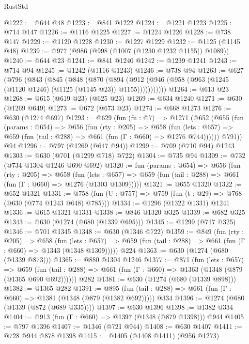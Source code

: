\begin{lexlean}{RustStd}
\begin{coremodule}
@1222 := @644 @48
@1223 := @841 @1222
@1224 := @1221 @1223
@1225 := @714 @147
@1226 := @1116 @1225
@1227 := @1224 @1226
@1228 := @738 @147
@1229 := @1120 @1228
@1230 := @1227 @1229
@1232 := @1125 (@1145 @48)
@1239 := @977 (@986 (@998 (@1007 (@1230 @1232 @1155)) @1089))
@1240 := @644 @23
@1241 := @841 @1240
@1242 := @1239 @1241
@1243 := @714 @94
@1245 := @1242 (@1116 @1243)
@1246 := @738 @94
@1263 := @627
    (@796
      (@843
        (@845
          (@848
            (@870
              (@894
                (@912 (@946 (@958 (@963 (@1245 (@1120 @1246) (@1125 (@1145 @23)) @1155)))))))))))
@1264 := @613 @23
@1268 := @615 (@619 @23) (@625 @23)
@1269 := @634 @1240
@1271 := @630 (@1269 @649)
@1273 := @672 (@673 @23)
@1274 := @668 @1273
@1276 := @630 (@1274 @697)
@1293 := @629
    (fun (fn : @7) =>
    @1271
      (@652
        (@655
          (fun (params : @654) =>
          @656
            (fun (rty : @205) =>
            @658
              (fun (lets : @657) =>
              @659 (fun (tail : @288) => @661 (fun (Γ : @660) => @1276 @744))))))
        @791))
    @94
@1296 := @797 (@1269 (@647 @94))
@1299 := @709 (@710 @94) @1243
@1303 := @630 (@701 (@1299 @718) @722)
@1304 := @735 @94
@1309 := @732 (@734 @1304 @1246 @690 @692)
@1320 := fun (params : @654) =>
  @656
    (fun (rty : @205) =>
    @658
      (fun (lets : @657) =>
      @659 (fun (tail : @288) => @661 (fun (Γ : @660) => @1276 (@1303 @1309)))))
@1321 := @655 @1320
@1322 := @652 @1321
@1331 := @758 (fun (U : @757) => @759 (fun (t : @29) => @768 (@630 (@774 @1243 @648) @785)))
@1334 := @1296 (@1322 @1331) @1241
@1336 := @615 @1321 @1331
@1338 := @846 @1320 @325
@1339 := @682 @325
@1343 := @630 (@1274 (@680 (@1339 @695)))
@1345 := @1299 (@717 @325)
@1346 := @701 @1345
@1348 := @630 (@1346 @722)
@1359 := @849
    (fun (rty : @205) =>
    @658
      (fun (lets : @657) =>
      @659 (fun (tail : @288) => @661 (fun (Γ : @660) => @1343 (@1348 @1309)))))
    @224
@1363 := @630 (@1274 (@680 (@1339 @873)))
@1365 := @880 @1304 @1246
@1377 := @871
    (fun (lets : @657) =>
    @659 (fun (tail : @288) => @661 (fun (Γ : @660) => @1363 (@1348 (@879 (@1365 @690 @692))))))
    @282
@1381 := @630 (@1274 (@680 (@1339 @898)))
@1382 := @1365 @282
@1391 := @895 (fun (tail : @288) => @661 (fun (Γ : @660) => @1381 (@1348 (@879 (@1382 @692))))) @334
@1396 := @1274 (@680 (@1339 (@872 (@689 @335))))
@1397 := @630 @1396
@1398 := @1382 @334
@1404 := @913 (fun (Γ : @660) => @1397 (@1348 (@879 @1398))) @944
@1405 := @797 @1396
@1407 := @1346 (@721 @944)
@1408 := @630 @1407
@1411 := @728 @944 @878 @1398
@1415 := @1405 (@1408 @1411) (@956 @1273)

\end{coremodule}
\end{lexlean}
